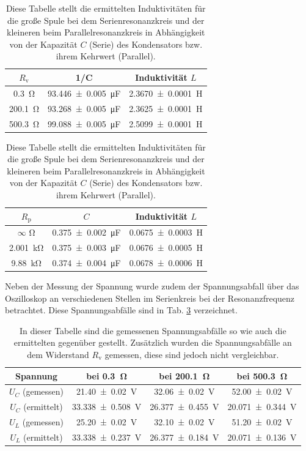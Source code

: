 	\begin{table}
		\caption{Diese Tabelle stellt die ermittelten Induktivitäten für die große Spule bei dem Serienresonanzkreis und der kleineren beim Parallelresonanzkreis in Abhängigkeit von der Kapazität $C$ (Serie) des Kondensators bzw. ihrem Kehrwert (Parallel).}
		\label{tab:L}
		\centering
		\begin{tabular}{c|c|c}
			$R_\text{v}$ & 1/C & Induktivität $L$ \\
			\hline
			\SI{0,3}{\ohm} & \SI{93,446+-0,005}{\micro\farad} & \SI{2,3670+-0,0001}{\henry} \\
			\SI{200,1}{\ohm} & \SI{93,268+-0,005}{\micro\farad} & \SI{2,3625+-0,0001}{\henry} \\ 
			\SI{500,3}{\ohm} & \SI{99,088+-0,005}{\micro\farad} & \SI{2,5099+-0,0001}{\henry} \\ 
		\end{tabular}
		\begin{tabular}{c|c|c}
			$R_\text{p}$ & $C$ & Induktivität $L$ \\
			\hline
			$\infty$ \si{\ohm} & \SI{0,375+-0,002}{\micro\farad} & \SI{0,0675+-0,0003}{\henry} \\
			\SI{2,001}{\kilo\ohm} & \SI{0,375+-0,003}{\micro\farad} & \SI{0,0676+-0,0005}{\henry} \\ 
			\SI{9,88}{\kilo\ohm} & \SI{0,374+-0,004}{\micro\farad} & \SI{0,0678+-0,0006}{\henry} \\
		\end{tabular}
	\end{table}
	Neben der Messung der Spannung wurde zudem der Spannungsabfall über das Oszilloskop an verschiedenen Stellen im Serienkreis bei der Resonanzfrequenz betrachtet.
	Diese Spannungsabfälle sind in Tab. \ref{tab:Abfall} verzeichnet. 
	\begin{table}
		\caption{In dieser Tabelle sind die gemessenen Spannungsabfälle so wie auch die ermittelten gegenüber gestellt. Zusätzlich wurden die Spannungsabfälle an dem Widerstand $R_\text{v}$ gemessen, diese sind jedoch nicht vergleichbar.}
		\label{tab:Abfall}
		\centering
		\begin{tabular}{c|c|c|c}
			Spannung & bei \SI{0,3}{\ohm} & bei \SI{200,1}{\ohm} & bei \SI{500,3}{\ohm}\\
			\hline
			$U_C$ (gemessen) & \SI{21,40+-0,02}{\volt} & \SI{32,06+-0,02}{\volt} & \SI{52,00+-0,02}{\volt} \\
			$U_C$ (ermittelt) & \SI{33,338+-0,508}{\volt} & \SI{26,377+-0,455}{\volt} & \SI{20,071+-0,344}{\volt} \\
			\hline
			$U_L$ (gemessen)  & \SI{25,20+-0,02}{\volt} & \SI{32,10+-0,02}{\volt} & \SI{51,20+-0,02}{\volt} \\
			$U_L$ (ermittelt)  & \SI{33,338+-0,237}{\volt} & \SI{26,377+-0,184}{\volt} & \SI{20,071+-0.136}{\volt} \\
		\end{tabular}
	\end{table}

